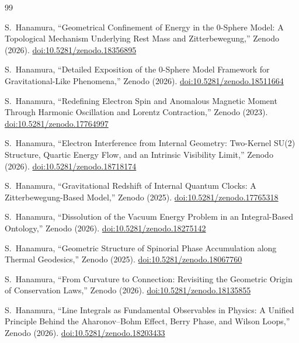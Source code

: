 \documentclass[%
 reprint,
 amsmath,amssymb,
 aps,
 prb,
]{revtex4-2}
\numberwithin{equation}{section}
\begin{document}
\begin{thebibliography}{99}

S.~Hanamura, ``Geometrical Confinement of Energy in the 0-Sphere Model: A Topological Mechanism Underlying Rest Mass and Zitterbewegung,'' Zenodo (2026). \href{https://doi.org/10.5281/zenodo.18356895}{doi:10.5281/zenodo.18356895}

S.~Hanamura, ``Detailed Exposition of the 0-Sphere Model Framework for Gravitational-Like Phenomena,'' Zenodo (2026). \href{https://doi.org/10.5281/zenodo.18511664}{doi:10.5281/zenodo.18511664}

S.~Hanamura, ``Redefining Electron Spin and Anomalous Magnetic Moment Through Harmonic Oscillation and Lorentz Contraction,'' Zenodo (2023). \href{https://doi.org/10.5281/zenodo.17764997}{doi:10.5281/zenodo.17764997}

S.~Hanamura, ``Electron Interference from Internal Geometry: Two-Kernel SU(2) Structure, Quartic Energy Flow, and an Intrinsic Visibility Limit,'' Zenodo (2026). \href{https://doi.org/10.5281/zenodo.18718174}{doi:10.5281/zenodo.18718174}

S.~Hanamura, ``Gravitational Redshift of Internal Quantum Clocks: A Zitterbewegung-Based Model,'' Zenodo (2025). \href{https://doi.org/10.5281/zenodo.17765318}{doi:10.5281/zenodo.17765318}

S.~Hanamura, ``Dissolution of the Vacuum Energy Problem in an Integral-Based Ontology,'' Zenodo (2026). \href{https://doi.org/10.5281/zenodo.18275142}{doi:10.5281/zenodo.18275142}

S.~Hanamura, ``Geometric Structure of Spinorial Phase Accumulation along Thermal Geodesics,'' Zenodo (2025). \href{https://doi.org/10.5281/zenodo.18067760}{doi:10.5281/zenodo.18067760}

S.~Hanamura, ``From Curvature to Connection: Revisiting the Geometric Origin of Conservation Laws,'' Zenodo (2026). \href{https://doi.org/10.5281/zenodo.18135855}{doi:10.5281/zenodo.18135855}

S.~Hanamura, ``Line Integrals as Fundamental Observables in Physics: A Unified Principle Behind the Aharonov--Bohm Effect, Berry Phase, and Wilson Loops,'' Zenodo (2026). \href{https://doi.org/10.5281/zenodo.18203433}{doi:10.5281/zenodo.18203433}


\end{thebibliography}
\end{document}
